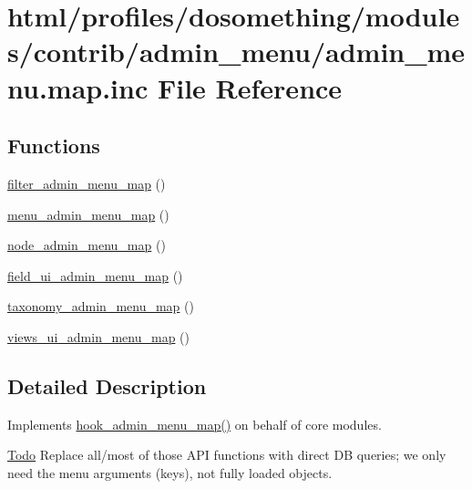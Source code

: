 \hypertarget{admin__menu_8map_8inc}{
\section{html/profiles/dosomething/modules/contrib/admin\_\-menu/admin\_\-menu.map.inc File Reference}
\label{admin__menu_8map_8inc}
}
\subsection*{Functions}
\begin{DoxyCompactItemize}
\item 
\hyperlink{admin__menu_8map_8inc_ad1c4e40dd26113df9b8ae87691ada8ae}{filter\_\-admin\_\-menu\_\-map} ()
\item 
\hyperlink{admin__menu_8map_8inc_afb91fc5bbb65b06defebf57feae92cd7}{menu\_\-admin\_\-menu\_\-map} ()
\item 
\hyperlink{admin__menu_8map_8inc_a645da462c9f34a48bdfc0d76c47c1d8d}{node\_\-admin\_\-menu\_\-map} ()
\item 
\hyperlink{admin__menu_8map_8inc_a4641b75b26fd20d33c541e0b50b7cca9}{field\_\-ui\_\-admin\_\-menu\_\-map} ()
\item 
\hyperlink{admin__menu_8map_8inc_a9cf1f3384b4db256d5c656285569e9fa}{taxonomy\_\-admin\_\-menu\_\-map} ()
\item 
\hyperlink{admin__menu_8map_8inc_a163fdee910cbe6b7d402a19850eb12c2}{views\_\-ui\_\-admin\_\-menu\_\-map} ()
\end{DoxyCompactItemize}


\subsection{Detailed Description}
Implements \hyperlink{admin__menu_8api_8php_a4b3f2235db483f670a2e7327633868df}{hook\_\-admin\_\-menu\_\-map()} on behalf of core modules.

\begin{Desc}
\item[\hyperlink{todo__todo000029}{Todo}]Replace all/most of those API functions with direct DB queries; we only need the menu arguments (keys), not fully loaded objects. \end{Desc}


